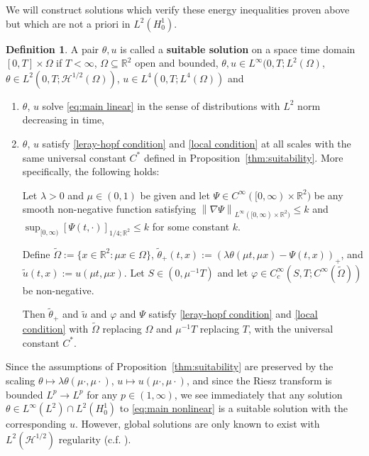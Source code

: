 \documentclass[11pt]{amsart}
\theoremstyle{remark}
\theoremstyle{definition}
\newtheorem{definition}{Definition}
\newcommand{\R}{\mathbb{R}}
\newcommand{\norm}[1]{\left\lVert#1\right\rVert}
\newcommand{\bracket}[1]{\left[ #1 \right]}
\newcommand{\grad}{\nabla}
\newcommand{\n}{^{-1}}
\newcommand{\Ctest}{C_c^\infty}
\newcommand{\HD}{\mathcal{H}}
\newcommand{\Csuit}{C^\ast}
\begin{document}
We will construct solutions which verify these energy inequalities proven above but which are not a priori in $L^2(H_0^1)$.  
\begin{definition}
A pair $\theta, u$ is called a \textbf{suitable solution} on a space time domain $[0,T]\times \Omega$ if $T <\infty$, $\Omega \subseteq\R^2$ open and bounded,  $\theta,u \in L^\infty(0,T;L^2(\Omega)$, $\theta \in L^2(0,T;\HD^{1/2}(\Omega))$, $u \in L^4(0,T; L^4(\Omega))$ and
\begin{enumerate}
\item $\theta$, $u$ solve \eqref{eq:main linear} in the sense of distributions with $L^2$ norm decreasing in time, \\
\item $\theta$, $u$ satisfy \eqref{leray-hopf condition} and \eqref{local condition} at all scales with the same universal constant $\Csuit$ defined in Proposition~\ref{thm:suitability}.  More specifically, the following holds:

Let $\lambda >0$ and $\mu \in (0,1)$ be given and let $\Psi \in C^\infty([0,\infty)\times \R^2)$ be any smooth non-negative function satisfying $\norm{\grad\Psi}_{L^\infty([0,\infty)\times\R^2)} \leq k$ and $\sup_{[0,\infty)} \bracket{\Psi(t,\cdot)}_{1/4; \R^2} \leq k$ for some constant $k$.  

Define $\tilde{\Omega} := \{x \in \R^2: \mu x \in \Omega\}$, $\tilde{\theta}_+(t,x) := (\lambda \theta(\mu t, \mu x)-\Psi(t, x))_+$, and $\tilde{u}(t,x):= u(\mu t, \mu x)$.  Let $S \in (0,\mu\n T)$ and let $\varphi \in \Ctest(S,T;C^\infty(\tilde{\Omega}))$ be non-negative.  

Then $\tilde{\theta}_+$ and $\tilde{u}$ and $\varphi$ and $\Psi$ satisfy \eqref{leray-hopf condition} and \eqref{local condition} with $\tilde{\Omega}$ replacing $\Omega$ and $\mu\n T$ replacing $T$, with the universal constant $\Csuit$.  
\end{enumerate}
\end{definition}

Since the assumptions of Proposition~\ref{thm:suitability} are preserved by the scaling $\theta \mapsto \lambda \theta(\mu\cdot, \mu \cdot)$, $u \mapsto u(\mu \cdot, \mu\cdot)$, and since the Riesz transform is bounded $L^p \to L^p$ for any $p \in (1,\infty)$, we see immediately that any solution $\theta \in L^\infty(L^2) \cap L^2(H_0^1)$ to \eqref{eq:main nonlinear} is a suitable solution with the corresponding $u$.  However, global solutions are only known to exist with $L^2(\HD^{1/2})$ regularity (c.f. \cite{CoIg.fraclap}).  
\end{document}
